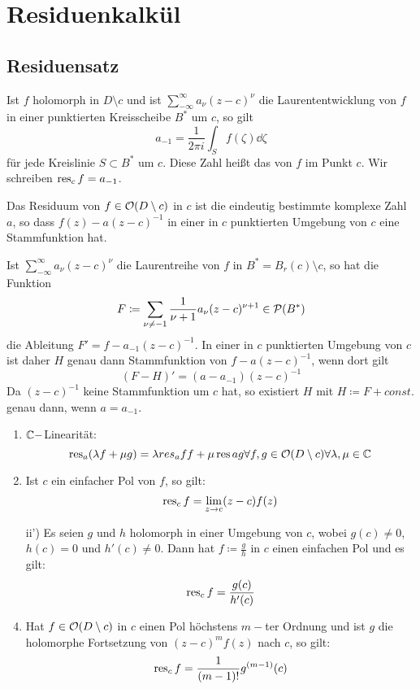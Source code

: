 \chapter{Residuenkalk\"ul}
\section{Residuensatz}
\begin{definition}
	Ist $ f $ holomorph in $ D\setminus c $ und ist $ \sum_{-\infty}^{\infty}a_\nu(z-c)^\nu $ die Laurententwicklung von $ f $ in einer punktierten Kreisscheibe $ B^\ast $ um $ c $, so gilt
	\[ a_{-1}=\frac{1}{2\pi i}\int_{S} f(\zeta)\dd\zeta \]
	f\"ur jede Kreislinie $ S\subset B^\ast $ um $ c $. Diese Zahl hei\ss t das  von $ f $ im Punkt $ c $. Wir schreiben $ \operatorname{res}_c f=a_{-1} $.
\end{definition}
\begin{satz}
	Das Residuum von $ f\in\mathcal O(D\setminus c) $ in $ c $ ist die eindeutig bestimmte komplexe Zahl $ a $, so dass $ f(z)-a(z-c)^{-1} $ in einer in $ c $ punktierten Umgebung von $ c $ eine Stammfunktion hat. 
\end{satz}
\begin{beweis}
	Ist $ \sum_{-\infty}^{\infty}a_\nu(z-c)^\nu $ die Laurentreihe von $ f $ in $ B^\ast=B_r(c)\setminus c $, so hat die Funktion
	\[ F\coloneqq\sum_{\nu\neq -1}^{}\frac{1}{\nu+1}a_\nu(z-c)^{\nu+1}\in\mathcal P(B^\ast) \]
	die Ableitung $ F' =f-a_{-1}(z-c)^{-1}$. In einer in $ c $ punktierten Umgebung von $ c $ ist daher $ H $ genau dann Stammfunktion von $ f-a(z-c)^{-1} $, wenn dort gilt
	\[ (F-H)'=(a-a_{-1})(z-c)^{-1} \]
	Da $ (z-c)^{-1} $ keine Stammfunktion um $ c $ hat, so existiert $ H $ mit $ H\coloneqq F+const. $ genau dann, wenn $ a=a_{-1} $.
\end{beweis}
\newpage
\begin{satz}
	\bullshit
	\begin{enumerate}
		\item $ \mathbb{C}- $Linearit\"at:
		\[ \operatorname{res}_a(\lambda f+\mu g)=\lambda res_a ff+\mu\operatorname{res} a g\forall f,g\in\mathcal O(D\setminus c)\forall\lambda,\mu\in\mathbb{C} \]
		\item Ist $ c $ ein einfacher Pol von $ f $, so gilt:
		\[ \operatorname{res}_c f=\lim_{z\to c}(z-c)f(z) \]
		\item[ii')] Es seien $ g $ und $ h $ holomorph in einer Umgebung von $ c $, wobei $ g(c)\neq 0 $, $ h(c)=0 $ und $ h'(c)\neq 0 $. Dann hat $ f\coloneqq\frac{g}{h} $ in $ c $ einen einfachen Pol und es gilt:
		\[ \operatorname{res}_c f=\frac{g(c)}{h'(c)} \]
		\item Hat $ f\in\mathcal O(D\setminus c) $ in $ c $ einen Pol h\"ochstens $ m- $ter Ordnung und ist $ g $ die holomorphe Fortsetzung von $ (z-c)^m f(z) $ nach $ c $, so gilt:
		\[ \operatorname{res}_c f=\frac{1}{(m-1)!}g^{(m-1)}(c) \]  
	\end{enumerate}
\end{satz}
